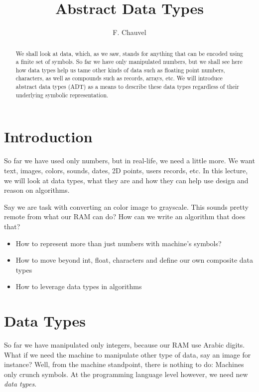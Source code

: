 \documentclass{aldast}
\title{Abstract Data Types}
\author{F. Chauvel}
\begin{document}
\maketitle

\begin{abstract}
  We shall look at data, which, as we saw, stands for anything that
  can be encoded using a finite set of symbols. So far we have only
  manipulated numbers, but we shall see here how data types help us
  tame other kinds of data such as floating point numbers, characters,
  as well as compounds such as records, arrays, etc. We will introduce
  abstract data types (ADT) as a means to describe these data types
  regardless of their underlying symbolic representation.
\end{abstract}


\section*{Introduction}

So far we have used only numbers, but in real-life, we need a little
more. We want text, images, colors, sounds, dates, 2D points, users
records, etc. In this lecture, we will look at data types, what they
are and how they can help use design and reason on algorithms.

Say we are task with converting an color image to grayscale. This
sounds pretty remote from what our RAM can do? How can we write an
algorithm that does that?

\begin{itemize}
  \item How to represent more than just numbers with machine's symbols?
  \item How to move beyond int, float, characters and define our own
    composite data types
  \item How to leverage data types in algorithms

\end{itemize}
 

\section{Data Types}

So far we have manipulated only integers, because our RAM use Arabic
digits. What if we need the machine to manipulate other type of data,
say an image for instance? Well, from the machine standpoint, there is
nothing to do: Machines only crunch symbols. At the programming
language level however, we need new \emph{data types}.
\end{document}
